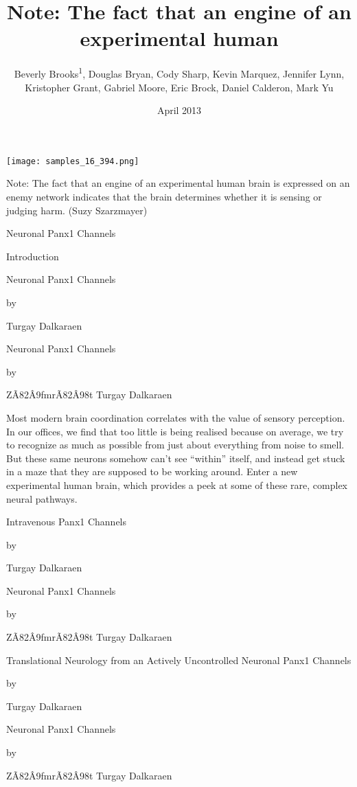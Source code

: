 \documentclass{article}
\title{Note: The fact that an engine of an experimental human}
\author{Beverly Brooks\textsuperscript{1},  Douglas Bryan,  Cody Sharp,  Kevin Marquez,  Jennifer Lynn,  Kristopher Grant,  Gabriel Moore,  Eric Brock,  Daniel Calderon,  Mark Yu}
\affil{\textsuperscript{1}University of Tennessee}
\date{April 2013}
\begin{document}
\maketitle

\begin{center}
\begin{minipage}{0.75\linewidth}
\texttt{[image: samples\_16\_394.png]}
\end{minipage}
\end{center}

Note: The fact that an engine of an experimental human brain is expressed on an enemy network indicates that the brain determines whether it is sensing or judging harm. (Suzy Szarzmayer)

Neuronal Panx1 Channels

Introduction

Neuronal Panx1 Channels

by

Turgay Dalkaraen

Neuronal Panx1 Channels

by

ZÃ\x82Â\x9fmrÃ\x82Â\x98t Turgay Dalkaraen

Most modern brain coordination correlates with the value of sensory perception. In our offices, we find that too little is being realised because on average, we try to recognize as much as possible from just about everything from noise to smell. But these same neurons somehow can’t see “within” itself, and instead get stuck in a maze that they are supposed to be working around. Enter a new experimental human brain, which provides a peek at some of these rare, complex neural pathways.

Intravenous Panx1 Channels

by

Turgay Dalkaraen

Neuronal Panx1 Channels

by

ZÃ\x82Â\x9fmrÃ\x82Â\x98t Turgay Dalkaraen

Translational Neurology from an Actively Uncontrolled Neuronal Panx1 Channels

by

Turgay Dalkaraen

Neuronal Panx1 Channels

by

ZÃ\x82Â\x9fmrÃ\x82Â\x98t Turgay Dalkaraen
\end{document}
